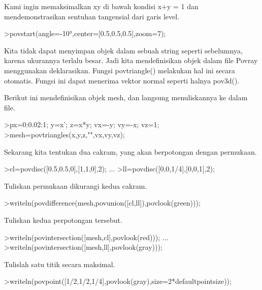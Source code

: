 \documentclass[12pt,Times new roman,letterpaper]{book}
\begin{document}
\begin{eulernootebook}
\begin{eulercomment}
\begin{eulercomment}
\begin{eulernootebook}
\begin{eulercomment}
\begin{eulercomment}
\begin{eulercomment}
\begin{eulercomment}
\begin{eulercomment}
\begin{eulercomment}
\begin{eulercomment}
\begin{eulernotebook}
\begin{eulercomment}
Kami ingin memaksimalkan xy di bawah kondisi x+y = 1 dan
mendemonstrasikan sentuhan tangensial dari garis level.
\end{eulercomment}
\begin{eulerprompt}
>povstart(angle=-10°,center=[0.5,0.5,0.5],zoom=7);
\end{eulerprompt}
\begin{eulercomment}
Kita tidak dapat menyimpan objek dalam sebuah string seperti
sebelumnya, karena ukurannya terlalu besar. Jadi kita mendefinisikan
objek dalam file Povray menggunakan deklarasikan. Fungsi povtriangle()
melakukan hal ini secara otomatis. Fungsi ini dapat menerima vektor
normal seperti halnya pov3d().

Berikut ini mendefinisikan objek mesh, dan langsung menuliskannya ke
dalam file.
\end{eulercomment}
\begin{eulerprompt}
>px=0:0.02:1; y=x'; z=x*y; vx=-y; vy=-x; vz=1;
>mesh=povtriangles(x,y,z,"",vx,vy,vz);
\end{eulerprompt}
\begin{eulercomment}
Sekarang kita tentukan dua cakram, yang akan berpotongan dengan
permukaan.
\end{eulercomment}
\begin{eulerprompt}
>cl=povdisc([0.5,0.5,0],[1,1,0],2); ...
>ll=povdisc([0,0,1/4],[0,0,1],2);
\end{eulerprompt}
\begin{eulercomment}
Tuliskan permukaan dikurangi kedua cakram.
\end{eulercomment}
\begin{eulerprompt}
>writeln(povdifference(mesh,povunion([cl,ll]),povlook(green)));
\end{eulerprompt}
\begin{eulercomment}
Tuliskan kedua perpotongan tersebut.
\end{eulercomment}
\begin{eulerprompt}
>writeln(povintersection([mesh,cl],povlook(red))); ...
>writeln(povintersection([mesh,ll],povlook(gray)));
\end{eulerprompt}
\begin{eulercomment}
Tulislah satu titik secara maksimal.
\end{eulercomment}
\begin{eulerprompt}
>writeln(povpoint([1/2,1/2,1/4],povlook(gray),size=2*defaultpointsize));
\end{eulerprompt}
\begin{eulercomment}

\end{eulercomment}
\end{eulernotebook}
\end{eulercomment}
\end{eulercomment}
\end{eulercomment}
\end{eulercomment}
\end{eulercomment}
\end{eulercomment}
\end{eulercomment}
\end{eulernootebook}
\end{eulercomment}
\end{eulercomment}
\end{eulernootebook}
\end{document}
